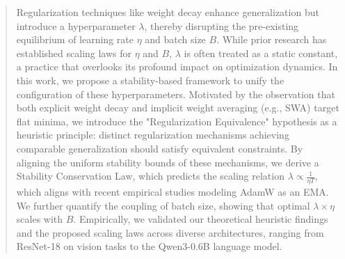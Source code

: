 \begin{abstract}
Regularization techniques like weight decay enhance generalization but introduce a hyperparameter $\lambda$, thereby disrupting the pre-existing equilibrium of learning rate $\eta$ and batch size $B$. While prior research has established scaling laws for $\eta$ and $B$, $\lambda$ is often treated as a static constant, a practice that overlooks its profound impact on optimization dynamics. In this work, we propose a stability-based framework to unify the configuration of these hyperparameters. Motivated by the observation that both explicit weight decay and implicit weight averaging (e.g., SWA) target flat minima, we introduce the "Regularization Equivalence" hypothesis as a heuristic principle: distinct regularization mechanisms achieving comparable generalization should satisfy equivalent constraints. By aligning the uniform stability bounds of these mechanisms, we derive a Stability Conservation Law, which predicts the scaling relation $\lambda \propto \frac{1}{\eta T}$, which aligns with recent empirical studies modeling AdamW as an EMA. We further quantify the coupling of batch size, showing that optimal $\lambda \times \eta$ scales with $B$. Empirically, we validated our theoretical heuristic findings and the proposed scaling laws across diverse architectures, ranging from ResNet-18 on vision tasks to the Qwen3-0.6B language model.


\end{abstract}


